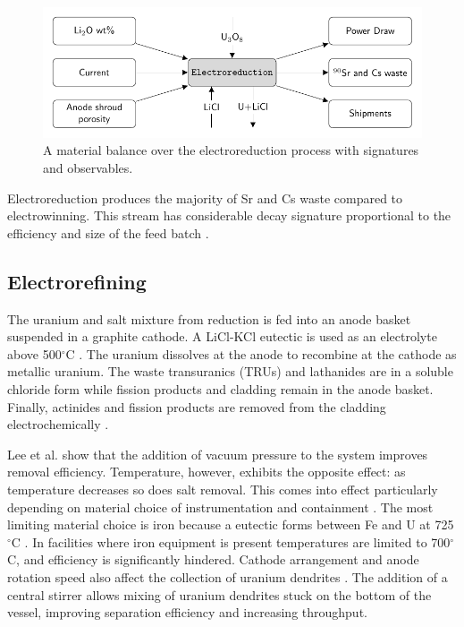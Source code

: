 \documentclass{anstrans}
\begin{document}
\begin{figure}[ht]
	\centering
	\includegraphics[width=1\linewidth]{reduction}
	\caption{A material balance over the electroreduction process with signatures and observables.}
	\label{fig:reduction}
\end{figure}

Electroreduction produces the majority of Sr and Cs waste compared to electrowinning. This stream has considerable decay 
signature proportional to the efficiency and size of the feed batch \cite{Borrelli_2017,flowsheet_1998}.

\subsection{Electrorefining}

The uranium and salt mixture from reduction is fed into an anode basket suspended in a graphite cathode. A LiCl-KCl eutectic is used as 
an electrolyte above 500$^{\circ}$C \cite{flowsheet_1998,lee_korean_2011}. The uranium dissolves at the anode to recombine at 
the cathode as metallic uranium. The waste transuranics (TRUs) and lathanides are in a soluble chloride form  while fission 
products and cladding remain in the anode basket. Finally, actinides and fission products are removed from the cladding 
electrochemically \cite{lee_korean_2011}.

Lee et al. \cite{lee_advanced_2008} show that the addition of vacuum pressure to the system improves removal efficiency. 
Temperature, however, exhibits the opposite effect: as temperature decreases so does salt removal. This comes into effect 
particularly depending on material choice of instrumentation and containment \cite{lee_advanced_2008}. The most limiting 
material choice is iron because a eutectic forms between Fe and U at 725$^{\circ}$C \cite{chapman_revision_1984}. 
In facilities where iron equipment is present temperatures are limited to 700$^{\circ}$C, and efficiency is 
significantly hindered. Cathode arrangement and anode rotation speed also affect the collection of uranium 
dendrites \cite{lee_advanced_2008}. The addition of a central stirrer allows mixing of uranium dendrites stuck on 
the bottom of the vessel, improving separation efficiency and increasing throughput. 
\end{document}
